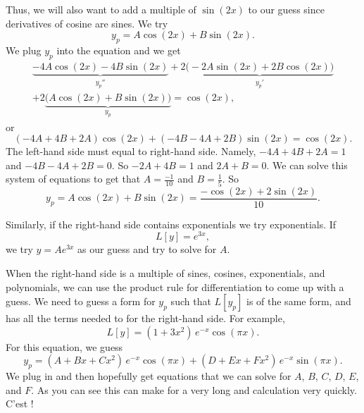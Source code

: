 \documentclass{ximera}
\begin{document}
\begin{exampleSol}
    Thus, we will also want to add a multiple of $\sin (2x)$ to our guess since derivatives of cosine are sines.  We try
    \begin{equation*}
        y_p = A \cos (2x) + B \sin (2x) .
    \end{equation*}
    We plug $y_p$ into the equation and we get
    \begin{multline*}
        \underbrace{-4 A \cos (2x) - 4 B \sin (2x)}_{y_p''} +2 \underbrace{\bigl(-2A \sin (2x) + 2B \cos (2x)\bigr)}_{y_p'} \\
        + 2 \underbrace{\bigl(A \cos (2x) + B \sin (2x)\bigr)}_{y_p} = \cos (2x) ,
    \end{multline*}
    or
    \begin{equation*}
        (-4A+4B+2A) \cos(2x) + (-4B-4A+2B) \sin(2x) = \cos(2x) .
    \end{equation*}
    The left-hand side must equal to right-hand side.  Namely, $-4A + 4B + 2A = 1$ and $-4B - 4A + 2B = 0$.  So $-2A+4B =1$ and $2A+B=0$. We can solve this system of equations to get that $A=\frac{-1}{10}$ and $B=\frac{1}{5}$.  So
    \begin{equation*}
        y_p = A \cos (2x) + B \sin (2x) = \frac{-\cos (2x) + 2 \sin (2x)}{10} .
    \end{equation*}
\end{exampleSol}

Similarly, if the right-hand side contains exponentials we try exponentials. If
\begin{equation*}
    L[y] = e^{3x},
\end{equation*}
we try $y = A e^{3x}$ as our guess and try to solve for $A$.

When the right-hand side is a multiple of sines, cosines, exponentials, and polynomials, we can use the product rule for differentiation to come up with a guess.  We need to guess a form for $y_p$ such that $L[y_p]$ is of the same form, and has all the terms needed to for  the right-hand side. For example,
\begin{equation*}
    L[y] = (1+3x^2)\,e^{-x}\cos (\pi x) .
\end{equation*}
For this equation, we guess
\begin{equation*}
    y_p = (A + Bx + Cx^2)\,e^{-x} \cos (\pi x) + (D + Ex + Fx^2)\,e^{-x} \sin (\pi x) .
\end{equation*}
We plug in and then hopefully get equations that we can solve for $A$, $B$, $C$, $D$, $E$, and $F$.
As you can see this can make for a very long and  %
calculation very quickly.  C'est ! %
\end{document}
